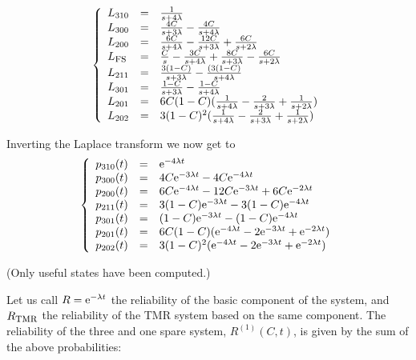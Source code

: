 \documentclass[11pt]{article}
\begin{document}
\begin{equation}
	\left\{
	 \begin{array}{lll}
	  L_{310} &=& \frac{1}{s+4\lambda}\\
	  L_{300} &=& \frac{4C}{s+3\lambda} - \frac{4C}{s+4\lambda}\\
	  L_{200} &=& \frac{6C}{s+4\lambda}-\frac{12C}{s+3\lambda}+\frac{6C}{s+2\lambda}\\
	  L_{\hbox{\sc fs}} &=& \frac{C}{s}-\frac{3C}{s+4\lambda}+\frac{8C}{s+3\lambda}-\frac{6C}{s+2\lambda}\\
	  L_{211} &=& \frac{3(1-C)}{s+3\lambda} - \frac{(3(1-C)}{s+4\lambda}\\
	  L_{301} &=& \frac{1-C}{s+3\lambda} - \frac{1-C}{s+4\lambda}\\
	  L_{201} &=& 6C(1-C) (\frac{1}{s+4\lambda}-\frac{2}{s+3\lambda}+\frac{1}{s+2\lambda})\\
	  L_{202} &=& 3(1-C)^2 (\frac{1}{s+4\lambda}-\frac{2}{s+3\lambda}+\frac{1}{s+2\lambda})
	 \end{array}
	\right.\nonumber
\end{equation}

Inverting the Laplace transform we now get to
\begin{equation}
	\left\{
	 \begin{array}{lll}
	  p_{310}(t) &=& \hbox{e}^{-4\lambda t}\\
	  p_{300}(t) &=& 4C\hbox{e}^{-3\lambda t} -4C\hbox{e}^{-4\lambda t}\\
	  p_{200}(t) &=& 6C\hbox{e}^{-4\lambda t} -12C \hbox{e}^{-3\lambda t} + 6C\hbox{e}^{-2\lambda t}\\
	  p_{211}(t) &=& 3(1-C)\hbox{e}^{-3\lambda t} - 3(1-C)\hbox{e}^{-4\lambda t}\\
	  p_{301}(t) &=& (1-C)\hbox{e}^{-3\lambda t}-(1-C)\hbox{e}^{-4\lambda t}\\
	  p_{201}(t) &=& 6C(1-C) (\hbox{e}^{-4\lambda t}-2\hbox{e}^{-3\lambda t}+\hbox{e}^{-2\lambda t})\\
	  p_{202}(t) &=& 3(1-C)^2 (\hbox{e}^{-4\lambda t}-2\hbox{e}^{-3\lambda t}+\hbox{e}^{-2\lambda t})
	 \end{array}
	\right.\nonumber
\end{equation}

\noindent
(Only useful states have been computed.)

Let us call $R=\hbox{e}^{-\lambda t}$ the reliability of the basic component of the system, and
$R_{\hbox{\sc tmr}}$ the reliability of the TMR system based on the same component.
The reliability of the three and one spare system, $R^{(1)}(C,t)$, is given by the sum of the above
probabilities:
\end{document}
